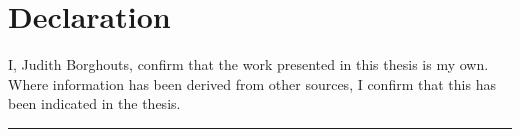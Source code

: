\section*{Declaration}
I, Judith Borghouts, confirm that the work presented in this thesis is my own. Where information has been derived from other sources, I confirm that this has been indicated in the thesis.

\vspace{2cm}
\par\noindent\rule{0.4\textwidth}{0.4pt}


\clearpage\mbox{}\thispagestyle{empty}\clearpage